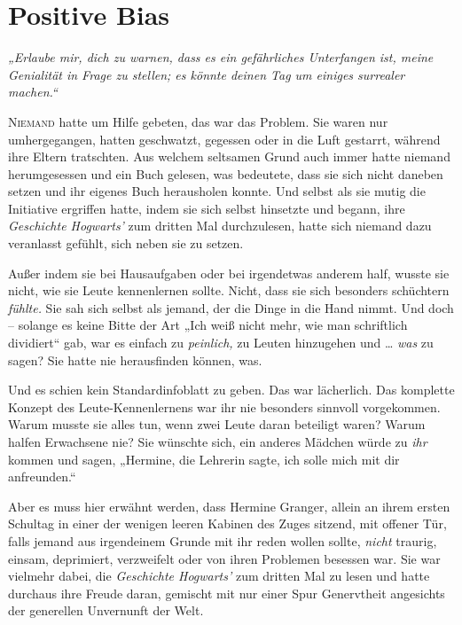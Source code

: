 \chapter{Positive Bias}

\emph{„Erlaube mir, dich zu warnen, dass es ein gefährliches Unterfangen ist, meine Genialität in Frage zu stellen; es könnte deinen Tag um einiges surrealer machen.“}

\later

\lettrine{N}{iemand} hatte um Hilfe gebeten, das war das Problem. Sie waren nur umhergegangen, hatten geschwatzt, gegessen oder in die Luft gestarrt, während ihre Eltern tratschten. Aus welchem seltsamen Grund auch immer hatte niemand herumgesessen und ein Buch gelesen, was bedeutete, dass sie sich nicht daneben setzen und ihr eigenes Buch herausholen konnte. Und selbst als sie mutig die Initiative ergriffen hatte, indem sie sich selbst hinsetzte und begann, ihre \emph{Geschichte Hogwarts’} zum dritten Mal durchzulesen, hatte sich niemand dazu veranlasst gefühlt, sich neben sie zu setzen.

Außer indem sie bei Hausaufgaben oder bei irgendetwas anderem half, wusste sie nicht, wie sie Leute kennenlernen sollte. Nicht, dass sie sich besonders schüchtern \emph{fühlte.} Sie sah sich selbst als jemand, der die Dinge in die Hand nimmt. Und doch – solange es keine Bitte der Art „Ich weiß nicht mehr, wie man schriftlich dividiert“ gab, war es einfach zu \emph{peinlich,} zu Leuten hinzugehen und … \emph{was} zu sagen? Sie hatte nie herausfinden können, was. 

Und es schien kein Standardinfoblatt zu geben. Das war lächerlich. Das komplette Konzept des Leute-Kennenlernens war ihr nie besonders sinnvoll vorgekommen. Warum musste sie alles tun, wenn zwei Leute daran beteiligt waren? Warum halfen Erwachsene nie? Sie wünschte sich, ein anderes Mädchen würde zu \emph{ihr} kommen und sagen, „Hermine, die Lehrerin sagte, ich solle mich mit dir anfreunden.“

Aber es muss hier erwähnt werden, dass Hermine Granger, allein an ihrem ersten Schultag in einer der wenigen leeren Kabinen des Zuges sitzend, mit offener Tür, falls jemand aus irgendeinem Grunde mit ihr reden wollen sollte, \emph{nicht} traurig, einsam, deprimiert, verzweifelt oder von ihren Problemen besessen war. Sie war vielmehr dabei, die \emph{Geschichte Hogwarts’} zum dritten Mal zu lesen und hatte durchaus ihre Freude daran, gemischt mit nur einer Spur Genervtheit angesichts der generellen Unvernunft der Welt. 

